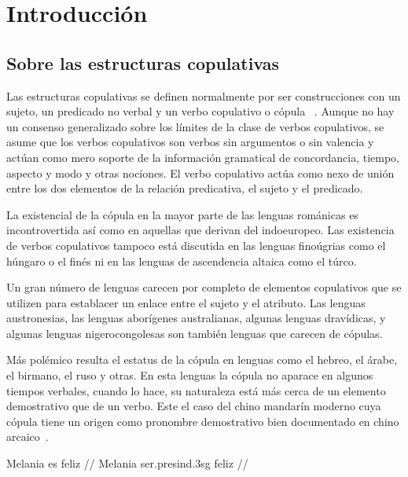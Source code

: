 \chapter{Introducción}
\vspace*{-.25in}
\section{Sobre las estructuras copulativas}
Las estructuras copulativas se definen normalmente por ser construcciones con un sujeto, un predicado no verbal y un verbo copulativo o cópula ~\autocite{Bentley20179Copular-and-}. Aunque no hay un consenso generalizado sobre los límites de la clase de verbos copulativos, se asume que los verbos copulativos son verbos sin argumentos o sin valencia y actúan como mero soporte de la información gramatical de concordancia, tiempo, aspecto y modo y otras nociones. El verbo copulativo actúa como nexo de unión entre los dos elementos de la relación predicativa, el sujeto y el predicado.

La existencial de la cópula en la mayor parte de las lenguas románicas es incontrovertida así como en aquellas que derivan del indoeuropeo. Las existencia de verbos copulativos tampoco está discutida en las lenguas finoúgrias como el húngaro o el finés ni en las lenguas de ascendencia altaica como el túrco. 

Un gran número de lenguas carecen por completo de elementos copulativos que se utilizen para establacer un enlace entre el sujeto y el atributo. Las lenguas austronesias, las lenguas aborígenes australianas, algunas lenguas dravídicas, y algunas lenguas nigerocongolesas son también lenguas que carecen de cópulas.

Más polémico resulta el estatus de la cópula en lenguas como el hebreo, el árabe, el birmano, el ruso y otras. En esta lenguas la cópula no aparace en algunos tiempos verbales, cuando lo hace, su naturaleza está más cerca de un elemento demostrativo que de un verbo. Este el caso del chino mandarín moderno cuya cópula tiene un origen como pronombre demostrativo bien documentado en chino arcaico~\parencites{Li1977Mechanismdevelopmentcopula}{Lohndal2009Copula-cycle}{Gelderen2011The-Pronominal}. 





\ex[glspace=!1em,everygla={},everyglb={},aboveglbskip=-.2ex]
\begingl
\gla Melania es feliz //
\glb Melania ser.{\sc presind}.{\sc 3sg} feliz  //
\endgl
\xe


